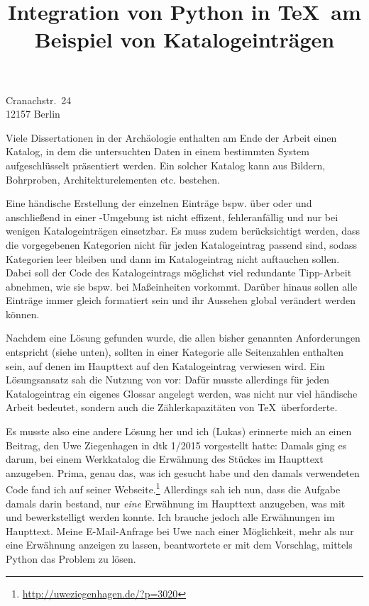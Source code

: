 \documentclass[ngerman]{dtk}
\begin{document}
\title{Integration von Python in \TeX\ am Beispiel von Katalogeinträgen}
%
			{Cranachstr.~24\\
			12157 Berlin\\
			}
\maketitle



Viele Dissertationen in der Archäologie enthalten am Ende der Arbeit einen Katalog, 
in dem die untersuchten Daten in einem bestimmten System aufgeschlüsselt präsentiert werden.
Ein solcher Katalog kann aus  Bildern, Bohrproben, Architekturelementen etc. bestehen.

Eine händische Erstellung der einzelnen Einträge bspw. über  oder  
und anschließend in einer -Umgebung ist nicht effizent, fehleranfällig und nur bei wenigen Katalogeinträgen einsetzbar.
Es muss zudem berücksichtigt werden, dass  die vorgegebenen Kategorien nicht für jeden Katalogeintrag passend sind, 
sodass  Kategorien leer bleiben  und dann im Katalogeintrag nicht auftauchen sollen.
Dabei soll der Code des Katalogeintrags möglichst viel redundante Tipp-Arbeit abnehmen, wie sie bspw. bei Maßeinheiten vorkommt.
Darüber hinaus sollen alle Einträge immer gleich formatiert sein und ihr Aussehen global verändert werden können.

Nachdem  eine  Lösung gefunden wurde, die allen bisher genannten Anforderungen entspricht (siehe unten),
sollten in einer Kategorie alle Seitenzahlen enthalten sein, auf denen im Haupttext auf den Katalogeintrag verwiesen wird.
Ein  Lösungsansatz sah die Nutzung von   vor: 
Dafür musste allerdings für jeden Katalogeintrag ein eigenes Glossar angelegt werden, was nicht nur viel händische Arbeit bedeutet,
sondern auch die Zählerkapazitäten von \TeX\ überforderte.

Es musste also eine andere Lösung her und ich (Lukas) erinnerte mich an einen Beitrag, den Uwe Ziegenhagen in dtk 1/2015 vorgestellt hatte:
Damals ging es darum, bei einem Werkkatalog die Erwähnung des Stückes im Haupttext anzugeben. 
Prima, genau das, was ich gesucht habe und den damals verwendeten Code fand  ich auf seiner Webseite.\footnote{\url{http://uweziegenhagen.de/?p=3020}}
Allerdings  sah ich nun, dass die Aufgabe  damals darin bestand, nur \emph{eine} Erwähnung im  Haupttext anzugeben,
was mit  und  bewerkstelligt werden konnte.
Ich brauche jedoch alle Erwähnungen im Haupttext.
Meine E-Mail-Anfrage bei Uwe nach einer Möglichkeit, mehr als nur eine Erwähnung anzeigen zu lassen,
beantwortete er mit dem Vorschlag, mittels Python das Problem zu lösen.
\end{document}
